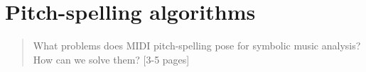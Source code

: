 \chapter{Pitch-spelling algorithms}
\label{chap:chap70}

\begin{quote}
    What problems does MIDI pitch-spelling pose for symbolic music analysis? How can we solve them? [3-5 pages]
\end{quote}
\clearpage













